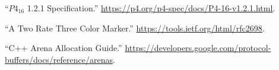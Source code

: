 \documentclass[11pt]{article}
\begin{document}
{%
{%
\begin{thebibliography}{44}%
\label{sec-bibliography}%

\mdbibitemlabel{{}[1]}\textquotedblleft{}$P4_{16}$ 1.2.1 Specification.\textquotedblright{} \href{https://p4.org/p4-spec/docs/P4-16-v1.2.1.html}{{\ttfamily https://\hspace{0pt}p4.\hspace{0pt}org/\hspace{0pt}p4-\hspace{0pt}spec/\hspace{0pt}docs/\hspace{0pt}P4-\hspace{0pt}16-\hspace{0pt}v1.\hspace{0pt}2.\hspace{0pt}1.\hspace{0pt}html}}.\label{p4spec}%

\mdbibitemlabel{{}[2]}\textquotedblleft{}A Two Rate Three Color Marker.\textquotedblright{} \href{https://tools.ietf.org/html/rfc2698}{{\ttfamily https://\hspace{0pt}tools.\hspace{0pt}ietf.\hspace{0pt}org/\hspace{0pt}html/\hspace{0pt}rfc2698}}.\label{rfc2698}%

\mdbibitemlabel{{}[3]}\textquotedblleft{}C++ Arena Allocation Guide.\textquotedblright{} \href{https://developers.google.com/protocol-buffers/docs/reference/arenas}{{\ttfamily https://\hspace{0pt}developers.\hspace{0pt}google.\hspace{0pt}com/\hspace{0pt}protocol-\hspace{0pt}buffers/\hspace{0pt}docs/\hspace{0pt}reference/\hspace{0pt}arenas}}.\label{arenaallocation}%


\end{thebibliography}}}
\end{document}
